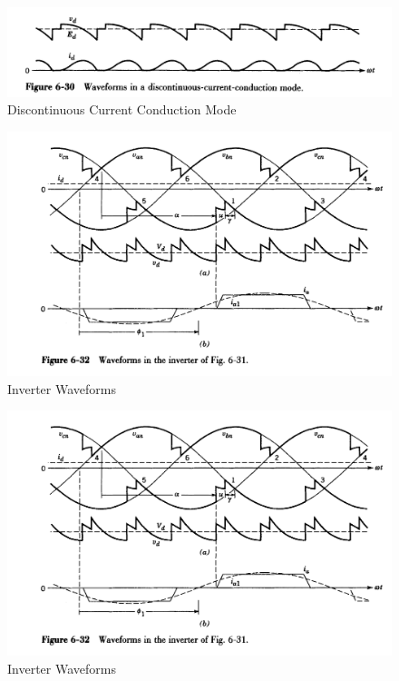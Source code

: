 \documentclass[twocolumn, ]{article}
\begin{document}
\begin{itemize}
\begin{figure}[!ht]
	\includegraphics[scale=0.27]{dcm.png}
	\caption{Discontinuous Current Conduction Mode}
\end{figure}

\begin{figure}[!ht]
	\includegraphics[scale=0.25]{inverter.png}
	\caption{Inverter Waveforms}
\end{figure}


\end{itemize}

\begin{figure}[!ht]
	\includegraphics[scale=0.25]{inverter.png}
	\caption{Inverter Waveforms}
\end{figure}
\end{document}
